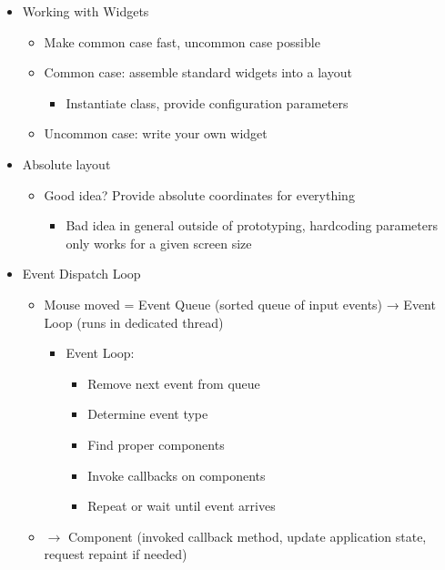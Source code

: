 \begin{itemize}
    \item Working with Widgets
    \begin{itemize}
        \item Make common case fast, uncommon case possible
        \item Common case: assemble standard widgets into a layout
        \begin{itemize}
            \item Instantiate class, provide configuration parameters
        \end{itemize}
    
        \item Uncommon case: write your own widget
    \end{itemize}
    
    \item Absolute layout
    \begin{itemize}
        \item Good idea? Provide absolute coordinates for everything
        \begin{itemize}
            \item Bad idea in general outside of prototyping, hardcoding parameters only works for a given screen size
        \end{itemize}
    \end{itemize}
    
    \item Event Dispatch Loop
    \begin{itemize}
        \item Mouse moved = Event Queue (sorted queue of input events) → Event Loop (runs in dedicated thread)
        \begin{itemize}
            \item Event Loop:
            \begin{itemize}
                \item Remove next event from queue
                \item Determine event type
                \item Find proper components
                \item Invoke callbacks on components
                \item Repeat or wait until event arrives
            \end{itemize}
        \end{itemize}
        
        \item $\to$ Component (invoked callback method, update application state, request repaint if needed)
    

\end{itemize}
\end{itemize}
